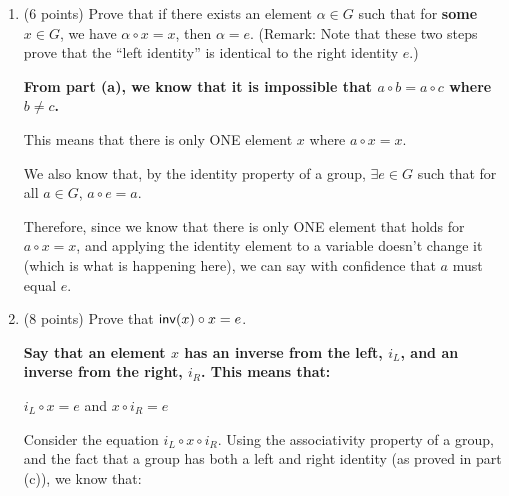 \documentclass[11pt]{article}
\begin{document}
\begin{enumerate}
\begin{enumerate}
{      Since $x\circ e = x$ is 100\% true (it's a property of a group), we can say with confidence that $e\circ x = x$.

  }
     \newpage
  \item (6 points) Prove that if there exists an element $\alpha \in G$ such that for \textbf{some} $x\in G$, we have $\alpha \circ x=x$, then $\alpha=e$.  \newline
  (Remark: Note that these two steps prove that the ``left identity'' is identical to the right identity $e$.) 
  \newline 
  {\bfseries
      \newline
      \newline
      From part (a), we know that it is impossible that $a\circ b = a\circ c$ where $b\neq c$. \newline


      This means that there is only ONE element $x$ where $a\circ x = x$. \newline

      We also know that, by the identity property of a group, $\exists e\in G$ such that for all $a\in G$, $a\circ e = a$. \newline

      Therefore, since we know that there is only ONE element that holds for $a\circ x = x$, and applying the identity element to a variable doesn't change it (which is what is happening here), we can say with confidence that $a$ must equal $e$.


  }
     \newpage
  
  
  
  \item (8 points) Prove that $\mathsf{inv}(x)\circ x = e$.  \newline
  {\bfseries
      \newline
      \newline
      Say that an element $x$ has an inverse from the left, $i_L$, and an inverse from the right, $i_R$. This means that:

      $i_L\circ x = e$ and $x\circ i_R = e$ \newline

      Consider the equation $i_L\circ x\circ i_R$. Using the associativity property of a group, and the fact that a group has both a left and right identity (as proved in part (c)), we know that: \newline

}
\end{enumerate}
\end{enumerate}
\end{document}
